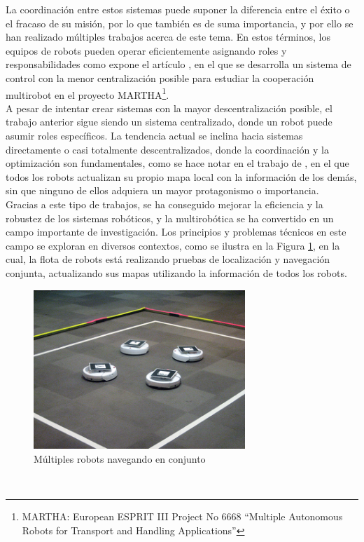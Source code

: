 La coordinación entre estos sistemas puede suponer la diferencia entre el éxito
o el fracaso de su misión, por lo que también es de suma importancia, y por ello
se han realizado múltiples trabajos acerca de este tema.
En estos términos, los equipos de robots pueden operar eficientemente asignando
roles y responsabilidades como expone el artículo \cite{Alami1998}, en el que se
desarrolla un sistema de control con la menor centralización posible para
estudiar la cooperación multirobot en el proyecto
MARTHA\footnote{MARTHA: European ESPRIT III Project No 6668 ``Multiple
Autonomous Robots for Transport and Handling Applications''}.
\\

A pesar de intentar crear sistemas con la mayor descentralización posible, el
trabajo anterior sigue siendo un sistema centralizado, donde un robot puede
asumir roles específicos.
La tendencia actual se inclina hacia sistemas directamente o casi totalmente
descentralizados, donde la coordinación y la optimización son fundamentales,
como se hace notar en el trabajo de \cite{Sheng2006}, en el que todos los robots
actualizan su propio mapa local con la información de los demás, sin que ninguno
de ellos adquiera un mayor protagonismo o importancia.
\\

Gracias a este tipo de trabajos, se ha conseguido mejorar la eficiencia y la
robustez de los sistemas robóticos, y la multirobótica se ha convertido en un
campo importante de investigación.
Los principios y problemas técnicos en este campo se exploran en diversos
contextos, como se ilustra en la Figura \ref{fig:multirobots}, en la cual, la
flota de robots está realizando pruebas de localización y navegación conjunta,
actualizando sus mapas utilizando la información de todos los robots.

\begin{figure} [h!]
  \begin{center}
    \includegraphics[width=8cm]{figs/multirobotics_navigation}
  \end{center}
  \caption{Múltiples robots navegando en conjunto \cite{multirobot_navigation}}
  \label{fig:multirobots}
\end{figure}\

